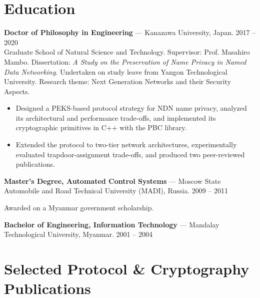 \section{Education}

\textbf{Doctor of Philosophy in Engineering} --- Kanazawa University, Japan. \hfill 2017 -- 2020 \\
Graduate School of Natural Science and Technology. Supervisor: Prof. Masahiro Mambo. Dissertation: \textit{A Study on the Preservation of Name Privacy in Named Data Networking}. Undertaken on study leave from Yangon Technological University. Research theme: Next Generation Networks and their Security Aspects.
\begin{itemize}
	\item Designed a PEKS-based protocol strategy for NDN name privacy, analyzed its architectural and performance trade-offs, and implemented its cryptographic primitives in C++ with the PBC library.
	\item Extended the protocol to two-tier network architectures, experimentally evaluated trapdoor-assignment trade-offs, and produced two peer-reviewed publications.
\end{itemize}

\textbf{Master's Degree, Automated Control Systems} --- Moscow State Automobile and Road Technical University (MADI), Russia. \hfill 2009 -- 2011

Awarded on a Myanmar government scholarship.

\textbf{Bachelor of Engineering, Information Technology} --- Mandalay Technological University, Myanmar. \hfill 2001 -- 2004

\section{Selected Protocol \& Cryptography Publications}


